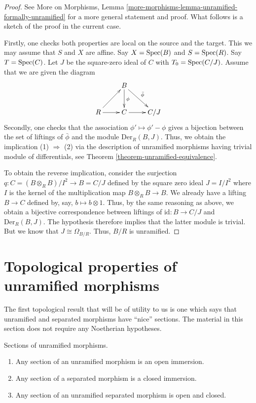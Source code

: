 \begin{proof}
See More on Morphisms,
Lemma \ref{more-morphisms-lemma-unramified-formally-unramified}
for a more general statement and proof.
What follows is a sketch of the proof in the current case.

\medskip\noindent
Firstly, one checks both properties are local on the source and the target.
This we may assume that $S$ and $X$ are affine.
Say $X = \mathop{\mathrm{Spec}}(B)$ and $S = \mathop{\mathrm{Spec}}(R)$.
Say $T = \mathop{\mathrm{Spec}}(C)$. Let $J$ be the square-zero ideal of $C$
with $T_0 = \mathop{\mathrm{Spec}}(C/J)$. Assume that we are given the diagram
$$
\xymatrix{
& B \ar[d]^\phi \ar[rd]^{\bar{\phi}}
& \\
R \ar[r] \ar[ur] & C \ar[r]
& C/J
}
$$
Secondly, one checks that the association $\phi' \mapsto \phi' - \phi$
gives a bijection between the set of liftings of $\bar{\phi}$ and the module
$\text{Der}_R(B, J)$. Thus, we obtain the implication (1) $\Rightarrow$ (2)
via the description of unramified morphisms having trivial module
of differentials, see Theorem \ref{theorem-unramified-equivalence}.

\medskip\noindent
To obtain the reverse implication, consider the surjection
$q : C = (B \otimes_R B)/I^2 \to B = C/J$ defined by the square zero ideal
$J = I/I^2$ where $I$ is the kernel of the multiplication map
$B \otimes_R B \to B$. We already have a lifting $B \to C$ defined by, say,
$b \mapsto b \otimes 1$. Thus, by the same reasoning as above, we obtain a
bijective correspondence between liftings of $\text{id} : B \to C/J$ and
$\text{Der}_R(B, J)$. The hypothesis therefore implies that the latter module is
trivial. But we know that $J \cong \Omega_{B/R}$. Thus, $B/R$ is unramified.
\end{proof}



\section{Topological properties of unramified morphisms}
\label{section-topological-unramified}

\noindent
The first topological result that will be of utility to us is one which says
that unramified and separated morphisms have ``nice'' sections.
The material in this section does not require any Noetherian hypotheses.

\begin{proposition}
\label{proposition-properties-sections}
Sections of unramified morphisms.
\begin{enumerate}
\item Any section of an unramified morphism is an open immersion.
\item Any section of a separated morphism is a closed immersion.
\item Any section of an unramified separated morphism is open and closed.
\end{enumerate}
\end{proposition}

